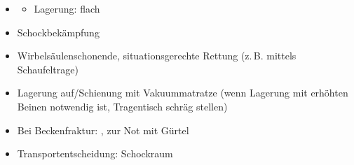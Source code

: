\label{m:beckentrauma-instabil}
\begin{itemize}
  \item \TxMassVitMKBes
  \begin{itemize}
    \item Lagerung: flach
  \end{itemize}
  \item Schockbekämpfung
  \item Wirbelsäulenschonende, situationsgerechte Rettung (z.\,B. mittels
  Schaufeltrage)
  \item Lagerung auf/Schienung mit Vakuummatratze (wenn
  Lagerung mit erhöhten Beinen notwendig ist,
  Tragentisch schräg stellen)
  \item Bei Beckenfraktur:
  , zur Not mit
  Gürtel
  \item Transportentscheidung: Schockraum
\end{itemize}